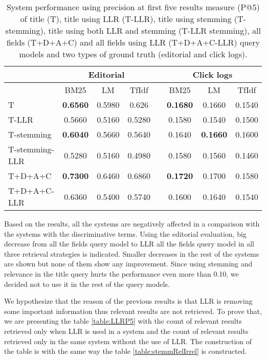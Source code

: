 \begin{table}[H]
\begin{center}
\caption{System performance   using precision at first five results measure (P@5) of title (T), title using LLR (T-LLR), title using stemming (T-stemming), title using both LLR and stemming (T-LLR stemming), all fields (T+D+A+C) and all fields using LLR (T+D+A+C-LLR) query models and two types of ground truth (editorial and click logs).}
\label{table:discP5}

\begin{tabular}{lccccccc}
\toprule
 & \multicolumn{3}{c}{Editorial} & & \multicolumn{3}{c}{Click logs} \\
\midrule
 & BM25 & LM & TfIdf &   & BM25 & LM & TfIdf \\
\midrule
T & \textbf{0.6560} &  0.5980 & 0.626 &   &      \textbf{0.1680} & 0.1660 & 0.1540 \\
T-LLR & 0.5660 & 0.5160 & 0.5280 &   &	 		 0.1580 & 0.1540 & 0.1500 \\
\midrule
T-stemming 	& \textbf{0.6040} & 0.5660 & 0.5640 &   &	 0.1640 & \textbf{0.1660} & 0.1600 \\
T-stemming-LLR & 0.5280 & 0.5160 & 0.4980 &   &	 0.1580 & 0.1560 & 0.1460 \\
\midrule
T+D+A+C & \textbf{0.7300} & 0.6460 & 0.6860 &   &		 \textbf{0.1720} & 0.1700 & 0.1580 \\
T+D+A+C-LLR & 0.6360 & 0.5400 & 0.5740 &   &	 0.1600 & 0.1640 & 0.1540 \\
\bottomrule
\end{tabular}
\end{center}
\end{table}


Based on the results, all the systems are negatively affected in a comparison with the systems with the discriminative terms. Using the editorial evaluation, big decrease from all the fields query model to LLR all the fields query model in all three retrieval strategies is indicated. Smaller decreases in the rest of the systems are shown but none of them show any improvement. Since using stemming and relevance in the title query hurts the performance even more than 0.10, we decided not to use it in the rest of the query models.


We hypothesize that the reason of the previous results is that LLR is removing some important information thus relevant results are not retrieved. To prove that, we are presenting the table \ref{table:LLRP5} with the count of relevant results retrieved only when LLR is used in a system and the count of relevant results retrieved only in the same system without the use of LLR.  The construction of the table is with the same way the table \ref{table:stemmRelIrrel} is constructed.

